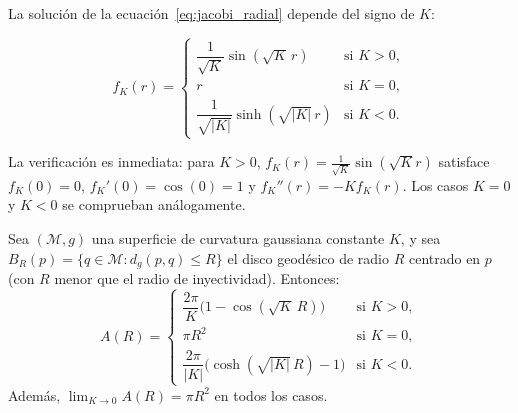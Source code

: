 La solución de la ecuación~\eqref{eq:jacobi_radial} depende del signo de $K$:

\begin{equation}\label{eq:soluciones_fK}
f_K(r) = \begin{cases}
\dfrac{1}{\sqrt{K}} \sin(\sqrt{K} \, r) & \text{si } K > 0, \\[8pt]
r & \text{si } K = 0, \\[8pt]
\dfrac{1}{\sqrt{|K|}} \sinh(\sqrt{|K|} \, r) & \text{si } K < 0.
\end{cases}
\end{equation}

La verificación es inmediata: para $K > 0$, $f_K(r) = \frac{1}{\sqrt{K}} \sin(\sqrt{K} r)$ satisface $f_K(0) = 0$, $f_K'(0) = \cos(0) = 1$ y $f_K''(r) = -K f_K(r)$. Los casos $K = 0$ y $K < 0$ se comprueban análogamente.

\begin{theorem}\label{thm:area_disco_geodesico}
Sea $(\mathcal{M}, g)$ una superficie de curvatura gaussiana constante $K$, y sea $B_R(p) = \{q \in \mathcal{M} : d_g(p,q) \leq R\}$ el disco geodésico de radio $R$ centrado en $p$ (con $R$ menor que el radio de inyectividad). Entonces:
\begin{equation}\label{eq:area_disco_geodesico}
A(R) = \begin{cases}
\dfrac{2\pi}{K}\bigl(1 - \cos(\sqrt{K} \, R)\bigr) & \text{si } K > 0, \\[8pt]
\pi R^2 & \text{si } K = 0, \\[8pt]
\dfrac{2\pi}{|K|}\bigl(\cosh(\sqrt{|K|} \, R) - 1\bigr) & \text{si } K < 0.
\end{cases}
\end{equation}
Además, $\lim_{K \to 0} A(R) = \pi R^2$ en todos los casos.
\end{theorem}


